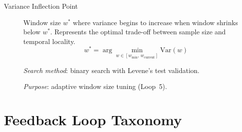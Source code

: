 \begin{description}
\item[Variance Inflection Point]
Window size $w^*$ where variance begins to increase when window shrinks below
$w^*$. Represents the optimal trade-off between sample size and temporal
locality.
\begin{equation*}
  w^* = \arg\min_{w \in [w_{\min},\, w_{\text{current}}]} \mathrm{Var}(w)
\end{equation*}

\textit{Search method}: binary search with Levene's test validation.

\textit{Purpose}: adaptive window size tuning (Loop~5).

\end{description}

\section*{Feedback Loop Taxonomy}

